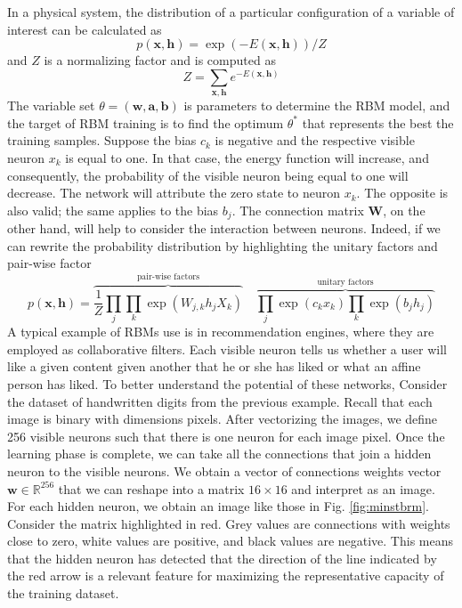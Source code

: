 In a physical system, the distribution of a particular configuration of a variable of interest can be calculated as 
\begin{equation}
p(\mathbf{x}, \mathbf{h})=\exp (-E(\mathbf{x}, \mathbf{h})) / Z
\end{equation}
and $Z$ is a normalizing factor and is computed as 
\begin{equation}
Z=\sum_{\mathbf{x}, \mathbf{h}} e^{-E(\mathbf{x}, \mathbf{h})}
\end{equation}
The variable set $\theta=(\mathbf{w}, \mathbf{a}, \mathbf{b})$ is parameters to determine the RBM model, and the target of RBM training is to find the optimum $\theta^*$ that represents the best the training samples. Suppose the bias $c_k$ is negative and the respective visible neuron $x_k$ is equal to one. In that case, the energy function will increase, and consequently, the probability of the visible neuron being equal to one will decrease. The network will attribute the zero state to neuron $x_k$. The opposite is also valid; the same applies to the bias $b_j$. The connection matrix $\mathbf{W}$, on the other hand, will help to consider the interaction between neurons. Indeed, if we can rewrite the probability distribution by highlighting the unitary factors and pair-wise factor
\begin{equation}
p\left(\mathbf{x},\mathbf{h}\right) = \overbrace{\frac{1}{Z}\prod_j \prod_k \exp\left(W_{j,k}h_jX_k\right)}^\text{pair-wise factors} \quad \overbrace{\prod_j \exp\left(c_kx_k\right) \prod_k \exp\left(b_jh_j\right)}^\text{unitary factors}
\end{equation}
A typical example of RBMs use is in recommendation engines, where they are employed as collaborative filters. Each visible neuron tells us whether a user will like a given content given another that he or she has liked or what an affine person has liked. To better understand the potential of these networks, Consider the dataset of handwritten digits from the previous example. Recall that each image is binary with dimensions  pixels. After vectorizing the images, we define 256 visible neurons such that there is one neuron for each image pixel. Once the learning phase is complete, we can take all the connections that join a hidden neuron to the visible neurons. We obtain a vector of connections weights vector $\mathbf{w} \in \mathbb{R}^{256}$ that we can reshape into a matrix $16 \times 16$ and interpret as an image. For each hidden neuron, we obtain an image like those in Fig. \ref{fig:minstbrm}. Consider the matrix highlighted in red. Grey values are connections with weights close to zero, white values are positive, and black values are negative. This means that the hidden neuron has detected that the direction of the line indicated by the red arrow is a relevant feature for maximizing the representative capacity of the training dataset.

